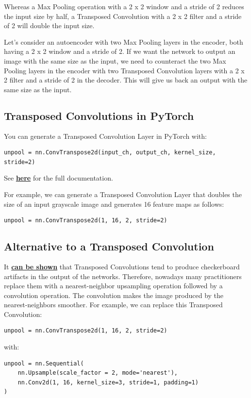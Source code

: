 Whereas a Max Pooling operation with a 2 x 2 window and a stride of 2 reduces the input size by half, a Transposed Convolution with a 2 x 2 filter and a stride of 2 will double the input size. \newline

Let's consider an autoencoder with two Max Pooling layers in the encoder, both having a 2 x 2 window and a stride of 2. If we want the network to output an image with the same size as the input, we need to counteract the two Max Pooling layers in the encoder with two Transposed Convolution layers with a 2 x 2 filter and a stride of 2 in the decoder. This will give us back an output with the same size as the input.

\subsection{Transposed Convolutions in PyTorch}

You can generate a Transposed Convolution Layer in PyTorch with:
\begin{lstlisting}
unpool = nn.ConvTranspose2d(input_ch, output_ch, kernel_size, stride=2)
\end{lstlisting}
See \href{https://pytorch.org/docs/stable/generated/torch.nn.ConvTranspose2d.html}{\textbf{here}} for the full documentation. \newline

For example, we can generate a Transposed Convolution Layer that doubles the size of an input grayscale image and generates 16 feature maps as follows:
\begin{lstlisting}
unpool = nn.ConvTranspose2d(1, 16, 2, stride=2)
\end{lstlisting}

\subsection{Alternative to a Transposed Convolution}

It \href{https://distill.pub/2016/deconv-checkerboard/}{\textbf{can be shown}} that Transposed Convolutions tend to produce checkerboard artifacts in the output of the networks. Therefore, nowadays many practitioners replace them with a nearest-neighbor upsampling operation followed by a convolution operation. The convolution makes the image produced by the nearest-neighbors smoother. For example, we can replace this Transposed Convolution:
\begin{lstlisting}
unpool = nn.ConvTranspose2d(1, 16, 2, stride=2)
\end{lstlisting}
with:
\begin{lstlisting}
unpool = nn.Sequential(
    nn.Upsample(scale_factor = 2, mode='nearest'),
    nn.Conv2d(1, 16, kernel_size=3, stride=1, padding=1)
)
\end{lstlisting}

